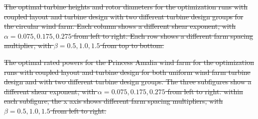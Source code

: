 \documentclass[wes, manuscript]{copernicus}
\providecommand{\DIFdel}[1]{{\protect\color{red}\sout{#1}}}                      %
\providecommand{\DIFdelFL}[1]{\DIFdel{#1}} %
\begin{document}

{%
\DIFdelFL{The optimal turbine heights and rotor diameters for the optimization runs with coupled layout and turbine design with two different turbine design groups for the circular wind farm. Each column shows a different shear exponent, with $\alpha=0.075,0.175,0.275$ from left to right. Each row shows a different farm spacing multiplier, with $\beta=0.5,1.0,1.5$ from top to bottom.}}

{%
\DIFdelFL{The optimal rated powers for the Princess Amalia wind farm for the optimization runs with coupled layout and turbine design for both uniform wind farm turbine design and with two different turbine design groups. The three subfigures show a different shear exponent, with $\alpha=0.075,0.175,0.275$ from left to right. within each subfigure, the x axis shows different farm spacing multipliers, with $\beta=0.5,1.0,1.5$ from left to right.}}
\end{document}
